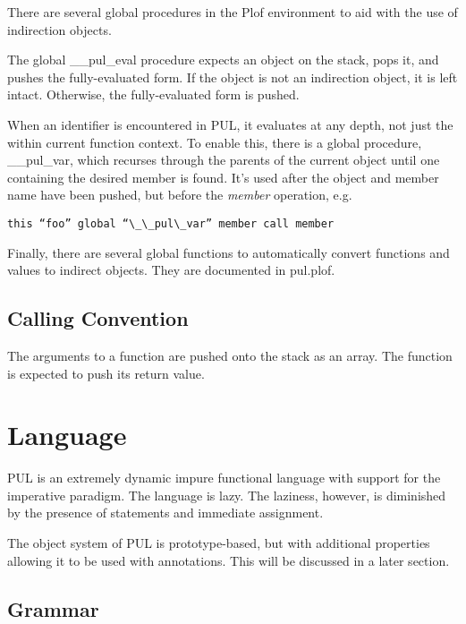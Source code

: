 There are several global procedures in the Plof environment to aid with the use of indirection objects.

The global \_\_pul\_eval procedure expects an object on the stack, pops it, and pushes the fully-evaluated form. If the object is not an indirection object, it is left intact. Otherwise, the fully-evaluated form is pushed.

When an identifier is encountered in PUL, it evaluates at any depth, not just the within current function context. To enable this, there is a global procedure, \_\_pul\_var, which recurses through the parents of the current object until one containing the desired member is found. It's used after the object and member name have been pushed, but before the \textit{member} operation, e.g.

\begin{verbatim}
this “foo” global “\_\_pul\_var” member call member
\end{verbatim}

Finally, there are several global functions to automatically convert functions and values to indirect objects. They are documented in pul.plof.



\subsection{Calling Convention}

The arguments to a function are pushed onto the stack as an array. The function is expected to push its return value.



\section{Language}

PUL is an extremely dynamic impure functional language with support for the imperative paradigm. The language is lazy. The laziness, however, is diminished by the presence of statements and immediate assignment.

The object system of PUL is prototype-based, but with additional properties allowing it to be used with annotations. This will be discussed in a later section.



\subsection{Grammar}

